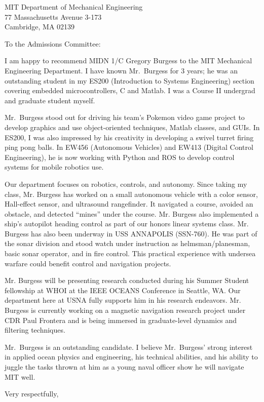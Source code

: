 \documentclass[12pt]{wrceletter}
\date{\today}
\begin{document}
\begin{letter}{%
MIT Department of Mechanical Engineering\\
77 Massachusetts Avenue 3-173\\
Cambridge, MA 02139}

\opening{To the Admissions Committee:}
\raggedright %
\setlength{\parindent}{15pt} %

I am happy to recommend MIDN 1/C Gregory Burgess to the MIT Mechanical Engineering Department. I have known Mr.~Burgess for 3 years; he was an outstanding student in my ES200 (Introduction to Systems Engineering) section covering embedded microcontrollers, C and Matlab. I was a Course II undergrad and graduate student myself. 

Mr.~Burgess stood out for driving his team's Pokemon video game project to develop graphics and use object-oriented techniques, Matlab classes, and GUIs. In ES200, I was also impressed by his creativity in developing a swivel turret firing ping pong balls. In EW456 (Autonomous Vehicles) and EW413 (Digital Control Engineering), he is now working with Python and ROS to develop control systems for mobile robotics use.

Our department focuses on robotics, controls, and autonomy. Since taking my class, Mr. Burgess has worked on a small autonomous vehicle with a color sensor, Hall-effect sensor, and ultrasound rangefinder. It navigated a course, avoided an obstacle, and detected ``mines'' under the course. Mr. Burgess also implemented a ship’s autopilot heading control as part of our honors linear systems class. Mr. Burgess has also been underway in USS ANNAPOLIS (SSN-760). He was part of the sonar division and stood watch under instruction as helmsman/planesman, basic sonar operator, and in fire control. This practical experience with undersea warfare could benefit control and navigation projects.

Mr. Burgess will be presenting research conducted during his Summer Student fellowship at WHOI at the IEEE OCEANS Conference in Seattle, WA. Our department here at USNA fully supports him in his research endeavors. Mr. Burgess is currently working on a magnetic navigation research project under CDR Paul Frontera and is being immersed in graduate-level dynamics and filtering techniques. 

Mr.~Burgess is an outstanding candidate. I believe Mr.~Burgess' strong interest in applied ocean physics and engineering, his technical abilities, and his ability to juggle the tasks thrown at him as a young naval officer show he will navigate MIT well. 

\closing{Very respectfully,} %

\end{letter}
\end{document}

